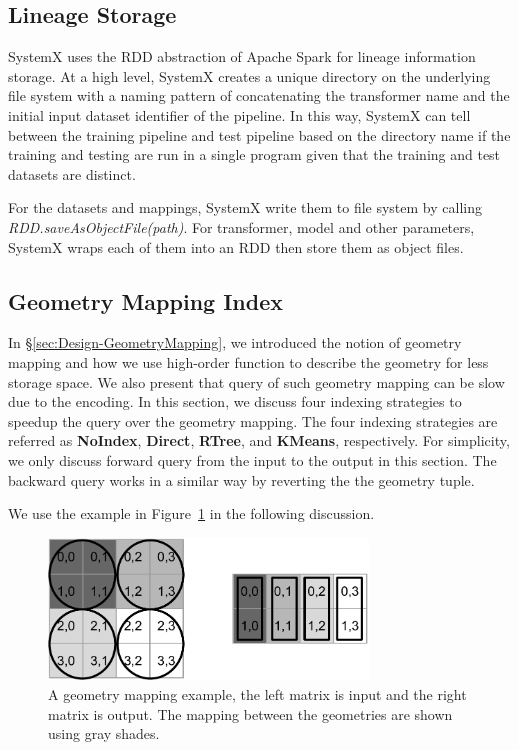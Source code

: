 \documentclass{sig-alternate}
\begin{document}
\subsection{Lineage Storage}
SystemX uses the RDD abstraction of Apache Spark for lineage information storage. 
At a high level, SystemX creates a unique directory on the underlying file system with a naming pattern of 
concatenating the transformer name and the initial input dataset identifier of the pipeline.
In this way, SystemX can tell between the training pipeline and test pipeline based on the directory name
if the training and testing are run in a single program given that the training and test datasets are distinct.

For the datasets and mappings, SystemX write them to file system by calling {\it RDD.saveAsObjectFile(path)}.
For transformer, model and other parameters, SystemX wraps each of them into an RDD then store them as object files.


\subsection{Geometry Mapping Index}
\label{sec:GeometryIndex}
In \S\ref{sec:Design-GeometryMapping}, we introduced the notion of geometry mapping and how we use high-order function
to describe the geometry for less storage space. 
We also present that query of such geometry mapping can be slow due to the encoding. 
In this section, we discuss four indexing strategies to speedup the query over the geometry mapping. 
The four indexing strategies are referred as {\bf NoIndex}, {\bf Direct}, {\bf RTree}, and {\bf KMeans}, respectively.
For simplicity, we only discuss forward query from the input to the output in this section.
The backward query works in a similar way by reverting the the geometry tuple.


We use the example in Figure~\ref{fig:example} in the following discussion.
\begin{figure}[h]
\begin{center}
    \includegraphics[width=85mm]{pictures/example}
\caption {A geometry mapping example, the left matrix is input and the right matrix is output. The mapping between the geometries are shown using gray shades.
    \label{fig:example}
}
\end{center}
\end{figure}
\end{document}
